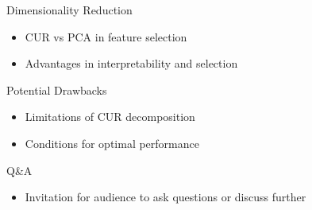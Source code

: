 \documentclass[pdf]
{beamer}
\begin{document}
\begin{frame}{Dimensionality Reduction}
    \begin{itemize}
        \item CUR vs PCA in feature selection
        \item Advantages in interpretability and selection
    \end{itemize}
\end{frame}

\begin{frame}{Potential Drawbacks}
    \begin{itemize}
        \item Limitations of CUR decomposition
        \item Conditions for optimal performance
    \end{itemize}
\end{frame}

\begin{frame}{Q\&A}
    \begin{itemize}
        \item Invitation for audience to ask questions or discuss further
    \end{itemize}
\end{frame}
\end{document}
